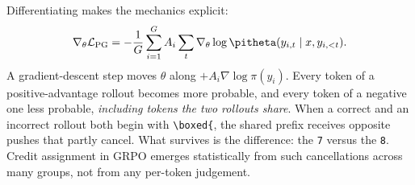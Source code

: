 Differentiating makes the mechanics explicit:
\begin{equation}
\nabla_\theta\mathcal{L}_{\text{PG}}=-\frac1G\sum_{i=1}^G A_i\sum_t\nabla_\theta\log\pitheta(y_{i,t}\mid x,y_{i,<t}).
\end{equation}
A gradient-descent step moves $\theta$ along $+A_i\nabla\log\pi(y_i)$. Every token of a
positive-advantage rollout becomes more probable, and every token of a negative one less
probable, \emph{including tokens the two rollouts share}. When a correct and an incorrect
rollout both begin with \verb|\boxed{|, the shared prefix receives opposite pushes that
partly cancel. What survives is the difference: the \verb|7| versus the \verb|8|.
Credit assignment in GRPO emerges statistically from such cancellations across many groups,
not from any per-token judgement.

